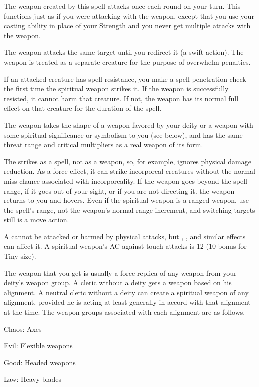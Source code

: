 \spellrng{\rngmed}
\begin{spelleffect}
  The weapon created by this spell attacks once each round on your turn. This functions just as if you were attacking with the weapon, except that you use your casting ability in place of your Strength and you never get multiple attacks with the weapon.
  \par The weapon attacks the same target until you redirect it (a swift action). The weapon is treated as a separate creature for the purpose of overwhelm penalties.
  \par If an attacked creature has spell resistance, you make a spell penetration check the first time the spiritual weapon strikes it. If the weapon is successfully resisted, it cannot harm that creature. If not, the weapon has its normal full effect on that creature for the duration of the spell.
  \par The weapon takes the shape of a weapon favored by your deity or a weapon with some spiritual significance or symbolism to you (see below), and has the same threat range and critical multipliers as a real weapon of its form.
\end{spelleffect}
\begin{spellnotes}
  The  strikes as a spell, not as a weapon, so, for example, ignores physical damage reduction. As a force effect, it can strike incorporeal creatures without the normal miss chance associated with incorporeality. If the weapon goes beyond the spell range, if it goes out of your sight, or if you are not directing it, the weapon returns to you and hovers. Even if the spiritual weapon is a ranged weapon, use the spell's range, not the weapon's normal range increment, and switching targets still is a move action.
  \par A  cannot be attacked or harmed by physical attacks, but , , and similar effects can affect it. A spiritual weapon's AC against touch attacks is 12 (10 \add {} bonus for Tiny size).
  \par The weapon that you get is usually a force replica of any weapon from your deity's weapon group. A cleric without a deity gets a weapon based on his alignment. A neutral cleric without a deity can create a spiritual weapon of any alignment, provided he is acting at least generally in accord with that alignment at the time. The weapon groups associated with each alignment are as follows.
  \par Chaos: Axes
  \par Evil: Flexible weapons
  \par Good: Headed weapons
  \par Law: Heavy blades
\end{spellnotes}

